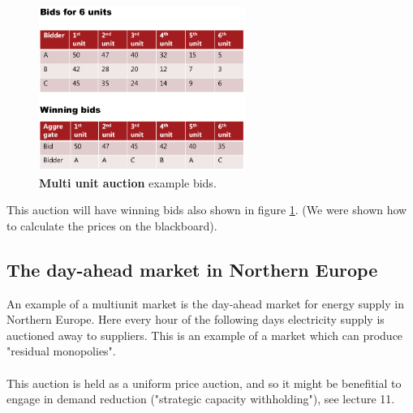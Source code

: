 \begin{figure}
\includegraphics[width=0.6\textwidth]{figures/multibids.png}    
\caption{\textbf{Multi unit auction} example bids.}
\label{fig: multiexample}
\end{figure}  

This auction will have winning bids also shown in figure \ref{fig: multiexample}. (We were shown how to calculate the prices on the blackboard).

\subsection{The day-ahead market in Northern Europe}
An example of a multiunit market is the day-ahead market for energy supply in Northern Europe. Here every hour of the following days electricity supply is auctioned away to suppliers. This is an example of a market which can produce "residual monopolies".
\\ \\
This auction is held as a uniform price auction, and so it might be benefitial to engage in demand reduction ("strategic capacity withholding"), see lecture 11.